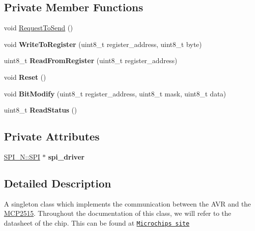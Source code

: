 \subsection*{Private Member Functions}
\begin{DoxyCompactItemize}
\item 
void \hyperlink{class_m_c_p2515_a5a218199ca1dfcb25cb95890bc0220fc}{Request\+To\+Send} ()
\item 
void {\bfseries Write\+To\+Register} (uint8\+\_\+t register\+\_\+address, uint8\+\_\+t byte)\hypertarget{class_m_c_p2515_adbc005a5975b77b0aef74363f3832f9b}{}\label{class_m_c_p2515_adbc005a5975b77b0aef74363f3832f9b}

\item 
uint8\+\_\+t {\bfseries Read\+From\+Register} (uint8\+\_\+t register\+\_\+address)\hypertarget{class_m_c_p2515_aafa4540f951a661dd68aa128baf5ee6b}{}\label{class_m_c_p2515_aafa4540f951a661dd68aa128baf5ee6b}

\item 
void {\bfseries Reset} ()\hypertarget{class_m_c_p2515_aa4d4138b984dc87116cf72ae104acb70}{}\label{class_m_c_p2515_aa4d4138b984dc87116cf72ae104acb70}

\item 
void {\bfseries Bit\+Modify} (uint8\+\_\+t register\+\_\+address, uint8\+\_\+t mask, uint8\+\_\+t data)\hypertarget{class_m_c_p2515_aa9a35fe139adf1fccaaceec561544c14}{}\label{class_m_c_p2515_aa9a35fe139adf1fccaaceec561544c14}

\item 
uint8\+\_\+t {\bfseries Read\+Status} ()\hypertarget{class_m_c_p2515_a966931bda84094f18672039cc8e06e18}{}\label{class_m_c_p2515_a966931bda84094f18672039cc8e06e18}

\end{DoxyCompactItemize}
\subsection*{Private Attributes}
\begin{DoxyCompactItemize}
\item 
\hyperlink{class_s_p_i___n_1_1_s_p_i}{S\+P\+I\+\_\+\+N\+::\+S\+PI} $\ast$ {\bfseries spi\+\_\+driver}\hypertarget{class_m_c_p2515_a3a5ca0d606115f1551a06d871606540e}{}\label{class_m_c_p2515_a3a5ca0d606115f1551a06d871606540e}

\end{DoxyCompactItemize}


\subsection{Detailed Description}
A singleton class which implements the communication between the A\+VR and the \hyperlink{class_m_c_p2515}{M\+C\+P2515}. Throughout the documentation of this class, we will refer to the datasheet of the chip. This can be found at \href{http://ww1.microchip.com/downloads/en/DeviceDoc/21801G.pdf}{\tt Microchips site} 


